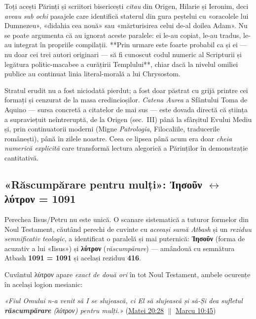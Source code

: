 \documentclass[12pt,a4paper,twoside,openany]{book}
\begin{document}
Toți acești Părinți și scriitori bisericești \textit{citau} din Origen, Hilarie și Ieronim, deci \textit{aveau sub ochi} pasajele care identifică staterul din gura peștelui cu «oracolele lui Dumnezeu», «didahia cea nouă» sau «mărturisirea celui de-al doilea Adam». Nu se poate argumenta că au ignorat aceste paralele: ei le-au copiat, le-au tradus, le-au integrat în propriile compilații. **Prin urmare este foarte probabil ca și ei --- nu doar cei trei autori originari --- să fi cunoscut codul numeric al Scripturii și legătura politic-macabee a curățirii Templului**, chiar dacă la nivelul omiliei publice au continuat linia literal-morală a lui Chrysostom.

Stratul erudit nu a fost niciodată pierdut; a fost doar păstrat cu grijă printre cei formați și cenzurat de la masa credincioșilor. \textit{Catena Aurea} a Sfântului Toma de Aquino --- sursa concretă a citatelor de mai sus --- este dovada directă că știința a supraviețuit neîntreruptă, de la Origen (sec.~III) până la sfârșitul Evului Mediu și, prin continuatorii moderni (Migne \textit{Patrologia}, Filocaliile, traducerile românești), până în zilele noastre. Ceea ce lipsea până acum era doar \textit{cheia numerică explicită} care transformă lectura alegorică a Părinților în demonstrație cantitativă.

\subsection*{«Răscumpărare pentru mulți»: Ἰησοῦν $\leftrightarrow$ λύτρον = 1091}\label{lytron}

Perechea Iisus/Petru nu este unică. O scanare sistematică a tuturor formelor din Noul Testament, căutând perechi de cuvinte cu \textit{aceeași sumă Atbash} și un \textit{reziduu semnificativ teologic}, a identificat o paralelă și mai puternică: \textbf{Ἰησοῦν} (forma de acuzativ a lui «Iisus») și \textbf{λύτρον} (\textit{răscumpărare}) --- amândouă cu semnătura Atbash \textbf{1091 = 1091} și același reziduu \textbf{416}.

Cuvântul λύτρον apare \textit{exact de două ori} în tot Noul Testament, ambele ocurențe în același logion mesianic:

\begin{biblequote}
\textit{«Fiul Omului n-a venit să I se slujească, ci El să slujească și să-Și dea sufletul \textbf{răscumpărare} (λύτρον) pentru mulți.»} (\href{https://bibliaortodoxa.ro/carte.php?id=55\&cap=20\#28}{Matei 20:28} $\parallel$ \href{https://bibliaortodoxa.ro/carte.php?id=53\&cap=10\#45}{Marcu 10:45})
\end{biblequote}
\end{document}
